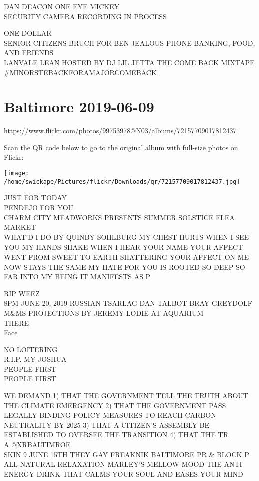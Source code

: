 \documentclass[10pt,letterpaper]{article}
\begin{document}
DAN DEACON ONE EYE MICKEY\\
SECURITY CAMERA RECORDING IN PROCESS

ONE DOLLAR\\
SENIOR CITIZENS BRUCH FOR BEN JEALOUS PHONE BANKING, FOOD, AND FRIENDS\\
LANVALE LEAN HOSTED BY DJ LIL JETTA THE COME BACK MIXTAPE \#MINORSTEBACKFORAMAJORCOMEBACK
\pagebreak

\section*{Baltimore 2019-06-09}

\url{https://www.flickr.com/photos/99753978@N03/albums/72157709017812437}

Scan the QR code below to go to the original album with full-size photos on Flickr:

\texttt{[image: /home/swickape/Pictures/flickr/Downloads/qr/72157709017812437.jpg]}
\pagebreak

JUST FOR TODAY\\
PENDEJO FOR YOU\\
CHARM CITY MEADWORKS PRESENTS SUMMER SOLSTICE FLEA MARKET\\
WHAT'D I DO BY QUINBY SOHLBURG MY CHEST HURTS WHEN I SEE YOU MY HANDS SHAKE WHEN I HEAR YOUR NAME YOUR AFFECT WENT FROM SWEET TO EARTH SHATTERING YOUR AFFECT ON ME NOW STAYS THE SAME MY HATE FOR YOU IS ROOTED SO DEEP SO FAR INTO MY BEING IT MANIFESTS AS P

RIP WEEZ\\
8PM JUNE 20, 2019 RUSSIAN TSARLAG DAN TALBOT BRAY GREYDOLF M\&MS PROJECTIONS BY JEREMY LODIE AT AQUARIUM\\
THERE\\
Face

NO LOITERING\\
R.I.P. MY JOSHUA\\
PEOPLE FIRST\\
PEOPLE FIRST

WE DEMAND 1) THAT THE GOVERNMENT TELL THE TRUTH ABOUT THE CLIMATE EMERGENCY 2) THAT THE GOVERNMENT PASS LEGALLY BINDING POLICY MEASURES TO REACH CARBON NEUTRALITY BY 2025 3) THAT A CITIZEN'S ASSEMBLY BE ESTABLISHED TO OVERSEE THE TRANSITION 4) THAT THE TR\\
A @XRBALTIMROE\\
SKIN 9 JUNE 15TH THEY GAY FREAKNIK BALTIMORE PR \& BLOCK P\\
ALL NATURAL RELAXATION MARLEY'S MELLOW MOOD THE ANTI ENERGY DRINK THAT CALMS YOUR SOUL AND EASES YOUR MIND
\end{document}
